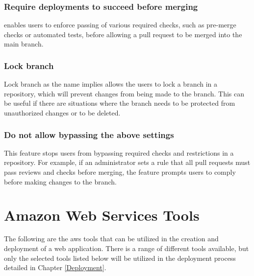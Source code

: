 \subsubsection{Require deployments to succeed before merging}
enables users to enforce passing of various required checks, such as pre-merge checks or automated tests, before allowing a pull request to be merged into the main branch.

\subsubsection{Lock branch}
Lock branch as the name implies allows the users to lock a branch in a repository, which will prevent changes from being made to the branch. This can be useful if there are situations where the branch needs to be protected from unauthorized changes or to be deleted. 

\subsubsection{Do not allow bypassing the above settings}
This feature stops users from bypassing required checks and restrictions in a repository. For example, if an administrator sets a rule that all pull requests must pass reviews and checks before merging, the feature prompts users to comply before making changes to the branch.




\section{Amazon Web Services Tools}

The following are the \acrshort{aws} tools that can be utilized in the creation and deployment of a web application. There is a range of different tools available, but only the selected tools listed below will be utilized in the deployment process detailed in Chapter \ref{Deployment}.

